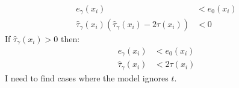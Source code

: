 \documentclass[oneside,12pt]{article}
\begin{document}
\begin{equation}
    \begin{split}
        e_\gamma(x_i) &< e_0(x_i)\\
        \hat{\tau}_\gamma(x_i) \left( \hat{\tau}_\gamma(x_i) - 2\tau(x_i) \right) &< 0
    \end{split}
\end{equation}
If $\hat{\tau}_\gamma(x_i) > 0$ then:
\begin{equation}
    \begin{split}
        e_\gamma(x_i) &< e_0(x_i)\\
        \hat{\tau}_\gamma(x_i) &< 2\tau(x_i)
    \end{split}
\end{equation}
I need to find cases where the model ignores $t$. 
%
%
\end{document}
